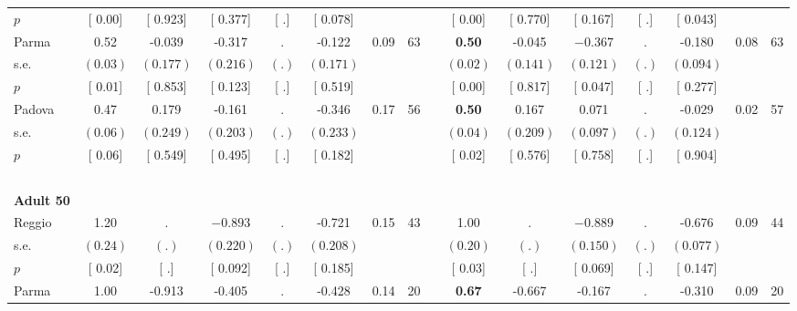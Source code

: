 \begin{longtable}{L{8em} c c c c c c c p{1em} c c c c c c c}
\quad \quad \quad \quad $ p$ & [     0.00] & [    0.923] & [    0.377] & [        .] & [    0.078] & & & & [     0.00] & [    0.770] & [    0.167] & [        .] & [    0.043] & &  \\[1em]
\quad \quad \quad Parma& 0.52 &    -0.039 &    -0.317 &         . &    -0.122 &      0.09 &        63 & & \textbf{     0.50} &    -0.045 & $ \mathbf{   -0.367}$ &         . &    -0.180 &      0.08 &        63  \\*
\quad \quad \quad \quad s.e.& $ (     0.03)$ & $ (    0.177)$ & $ (    0.216)$ & $ (        .)$ & $ (    0.171)$ & & & & $ (     0.02)$ & $ (    0.141)$ & $ (    0.121)$ & $ (        .)$ & $ (    0.094)$ & &  \\*
\quad \quad \quad \quad $ p$ & [     0.01] & [    0.853] & [    0.123] & [        .] & [    0.519] & & & & [     0.00] & [    0.817] & [    0.047] & [        .] & [    0.277] & &  \\[1em]
\quad \quad \quad Padova& 0.47 &     0.179 &    -0.161 &         . &    -0.346 &      0.17 &        56 & & \textbf{     0.50} &     0.167 &     0.071 &         . &    -0.029 &      0.02 &        57  \\*
\quad \quad \quad \quad s.e.& $ (     0.06)$ & $ (    0.249)$ & $ (    0.203)$ & $ (        .)$ & $ (    0.233)$ & & & & $ (     0.04)$ & $ (    0.209)$ & $ (    0.097)$ & $ (        .)$ & $ (    0.124)$ & &  \\*
\quad \quad \quad \quad $ p$ & [     0.06] & [    0.549] & [    0.495] & [        .] & [    0.182] & & & & [     0.02] & [    0.576] & [    0.758] & [        .] & [    0.904] & &  \\[1em]
~\\[1em]
\quad \quad \textbf{Adult 50} & & & & & & & & & & & & & & & \\* 
\quad \quad \quad Reggio& 1.20 &         . & $ \mathbf{   -0.893}$ &         . &    -0.721 &      0.15 &        43 & & 1.00 &         . & $ \mathbf{   -0.889}$ &         . &    -0.676 &      0.09 &        44  \\*
\quad \quad \quad \quad s.e.& $ (     0.24)$ & $ (        .)$ & $ (    0.220)$ & $ (        .)$ & $ (    0.208)$ & & & & $ (     0.20)$ & $ (        .)$ & $ (    0.150)$ & $ (        .)$ & $ (    0.077)$ & &  \\*
\quad \quad \quad \quad $ p$ & [     0.02] & [        .] & [    0.092] & [        .] & [    0.185] & & & & [     0.03] & [        .] & [    0.069] & [        .] & [    0.147] & &  \\[1em]
\quad \quad \quad Parma& 1.00 &    -0.913 &    -0.405 &         . &    -0.428 &      0.14 &        20 & & \textbf{     0.67} &    -0.667 &    -0.167 &         . &    -0.310 &      0.09 &        20  \\*

\end{longtable}
